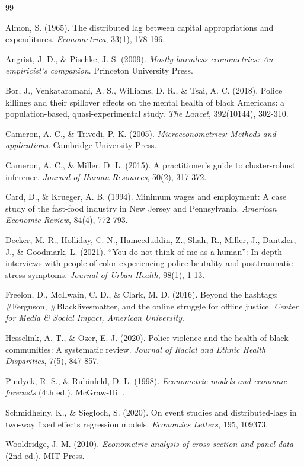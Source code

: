 \documentclass[11pt,a4paper]{article}
\begin{document}

\begin{thebibliography}{99}

Almon, S. (1965). The distributed lag between capital appropriations and expenditures. \textit{Econometrica}, 33(1), 178-196.

Angrist, J. D., \& Pischke, J. S. (2009). \textit{Mostly harmless econometrics: An empiricist's companion}. Princeton University Press.

Bor, J., Venkataramani, A. S., Williams, D. R., \& Tsai, A. C. (2018). Police killings and their spillover effects on the mental health of black Americans: a population-based, quasi-experimental study. \textit{The Lancet}, 392(10144), 302-310.

Cameron, A. C., \& Trivedi, P. K. (2005). \textit{Microeconometrics: Methods and applications}. Cambridge University Press.

Cameron, A. C., \& Miller, D. L. (2015). A practitioner's guide to cluster-robust inference. \textit{Journal of Human Resources}, 50(2), 317-372.

Card, D., \& Krueger, A. B. (1994). Minimum wages and employment: A case study of the fast-food industry in New Jersey and Pennsylvania. \textit{American Economic Review}, 84(4), 772-793.

Decker, M. R., Holliday, C. N., Hameeduddin, Z., Shah, R., Miller, J., Dantzler, J., \& Goodmark, L. (2021). ``You do not think of me as a human'': In-depth interviews with people of color experiencing police brutality and posttraumatic stress symptoms. \textit{Journal of Urban Health}, 98(1), 1-13.

Freelon, D., McIlwain, C. D., \& Clark, M. D. (2016). Beyond the hashtags: \#Ferguson, \#Blacklivesmatter, and the online struggle for offline justice. \textit{Center for Media \& Social Impact, American University}.

Hesselink, A. T., \& Ozer, E. J. (2020). Police violence and the health of black communities: A systematic review. \textit{Journal of Racial and Ethnic Health Disparities}, 7(5), 847-857.

Pindyck, R. S., \& Rubinfeld, D. L. (1998). \textit{Econometric models and economic forecasts} (4th ed.). McGraw-Hill.

Schmidheiny, K., \& Siegloch, S. (2020). On event studies and distributed-lags in two-way fixed effects regression models. \textit{Economics Letters}, 195, 109373.

Wooldridge, J. M. (2010). \textit{Econometric analysis of cross section and panel data} (2nd ed.). MIT Press.

\end{thebibliography}
\end{document}

